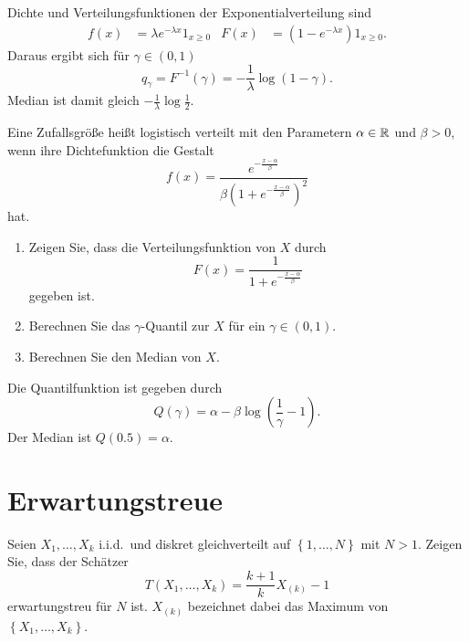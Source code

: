 \solution Dichte und Verteilungsfunktionen der Exponentialverteilung
sind
\begin{align*}
    f(x) &= \lambda e^{-\lambda x} 1_{x \geq 0} & F(x) &= \left( 1-e^{-\lambda x} \right)1_{x \geq 0}. 
\end{align*}
Daraus ergibt sich für $\gamma\in (0,1)$ 
\begin{equation*}
    q_{\gamma} = F^{-1}(\gamma) = -\frac{1}{\lambda} \log \left( 1-\gamma \right). 
\end{equation*}
Median ist damit gleich $-\frac{1}{\lambda} \log \frac{1}{2}$. 


 Eine Zufallsgröße heißt
logistisch verteilt mit den Parametern $\alpha\in\mathbb R$ und $\beta>0$, wenn ihre
Dichtefunktion die Gestalt
\begin{equation*}
    f(x) = \frac{e^{-\frac{x-\alpha}{\beta}}}
    {\beta\left( 1+e^{-\frac{x-\alpha}{\beta}} \right)^{2}}
\end{equation*}
hat.
\begin{enumerate}
    \item Zeigen Sie, dass die Verteilungsfunktion von $X$ durch
        \begin{equation*}
            F(x) = \frac{1}{1+e^{-\frac{x-\alpha}{\beta}}}
        \end{equation*}
        gegeben ist.

    \item Berechnen Sie das $\gamma$-Quantil zur $X$ für ein $\gamma\in (0,1)$. 
    \item Berechnen Sie den Median von $X$. 
\end{enumerate}

\solution Die Quantilfunktion ist gegeben durch
\begin{equation*}
    Q(\gamma) = \alpha - \beta \log\left( \frac{1}{\gamma} - 1 \right). 
\end{equation*}
Der Median ist $Q(0.5) = \alpha$.

\section{Erwartungstreue}

 Seien
$X_1,\dots ,X_k$ i.i.d.\ und diskret gleichverteilt auf $\left\{ 1,\dots ,N
\right\}$ mit $N>1$. Zeigen Sie, dass der Schätzer
\begin{equation*}
    T\left( X_1,\dots ,X_k \right) = \frac{k+1}{k} X_{(k)}-1
\end{equation*}
erwartungstreu für $N$ ist. $X_{(k)}$ bezeichnet dabei das Maximum von $\left\{
X_1,\dots ,X_k \right\}$. 

